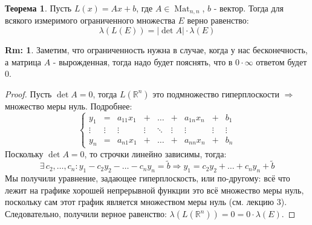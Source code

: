 \documentclass[12pt]{article}
\newcommand{\MR}{\mathbb{R}}
\theoremstyle{definition}
\newtheorem{rem}{Rm:}
\newtheorem{theorem}{Теорема}
\newcommand{\wte}[1]{\widetilde{#1}}
\newcommand{\mat}[2]{\operatorname{Mat}_{#1, #2}}
\begin{document}
\begin{theorem}
	Пусть $L(x) = Ax + b$, где $A \in \mat{n}{n}$, $b$ - вектор. Тогда для всякого измеримого ограниченного множества $E$ верно равенство:
	$$
		\lambda(L(E)) = |\det{A}|{\cdot}\lambda(E)
	$$
\end{theorem}
\begin{rem}
	Заметим, что ограниченность нужна в случае, когда у нас бесконечность, а матрица $A$ - вырожденная, тогда надо будет пояснять, что в $0{\cdot}\infty$ ответом будет $0$.
\end{rem}
\begin{proof}
	Пусть $\det{A} = 0$, тогда $L(\MR^n)$ это подмножество гиперплоскости $\Rightarrow$ множество меры нуль. Подробнее:
	$$
		\left\{
		\begin{matrix}
			y_1 &= & a_{11}x_1 & + & \dotsc & + & a_{1n}x_n & + & b_1 \\
			\vdots & \vdots & \vdots & \vdots & \ddots & \vdots & \vdots & \vdots & \vdots \\
			y_n &= & a_{n1}x_1 & + & \dotsc & + & a_{nn}x_n & + & b_n
		\end{matrix}\right.
	$$
	Поскольку $\det{A} = 0$, то строчки линейно зависимы, тогда:
	$$
		\exists \, c_2, \dotsc, c_n  \colon y_1 - c_2y_2 - \dotsc - c_n y_n = \wte{b} \Rightarrow y_1 = c_2y_2 + \dotsc + c_n y_n + \wte{b}
	$$
	Мы получили уравнение, задающее гиперплоскость, или по-другому: всё что лежит на графике хорошей непрерывной функции это всё множество меры нуль, поскольку сам этот график является множеством меры нуль (см. лекцию $3$). Следовательно, получили верное равенство: $\lambda(L(\MR^n)) = 0 = 0{\cdot}\lambda(E)$.
	

\end{proof}
\end{document}
